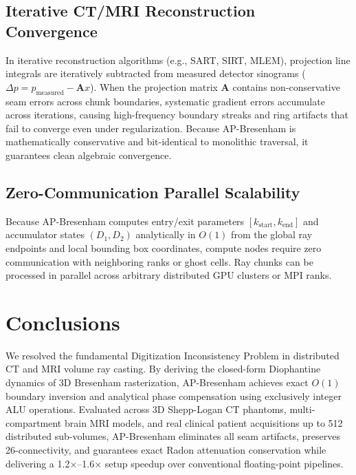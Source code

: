 \documentclass[11pt]{article}
\begin{document}
\subsection*{Iterative CT/MRI Reconstruction Convergence}
In iterative reconstruction algorithms (e.g., SART, SIRT, MLEM), projection line integrals are iteratively subtracted from measured detector sinograms ($\Delta p = p_{\mathrm{measured}} - \mathbf{A} x$). When the projection matrix $\mathbf{A}$ contains non-conservative seam errors across chunk boundaries, systematic gradient errors accumulate across iterations, causing high-frequency boundary streaks and ring artifacts that fail to converge even under regularization.\cite{zhang2023distributed,chen2023exact,wang2025distributed} Because AP-Bresenham is mathematically conservative and bit-identical to monolithic traversal, it guarantees clean algebraic convergence.

\subsection*{Zero-Communication Parallel Scalability}
Because AP-Bresenham computes entry/exit parameters $[k_{\mathrm{start}}, k_{\mathrm{end}}]$ and accumulator states $(D_1, D_2)$ analytically in $O(1)$ from the global ray endpoints and local bounding box coordinates, compute nodes require zero communication with neighboring ranks or ghost cells. Ray chunks can be processed in parallel across arbitrary distributed GPU clusters or MPI ranks.\cite{kim2024heterogeneous,wang2025distributed,liu2026ultra}

\section*{Conclusions}
\label{sec:conclusions}

We resolved the fundamental Digitization Inconsistency Problem in distributed CT and MRI volume ray casting. By deriving the closed-form Diophantine dynamics of 3D Bresenham rasterization, AP-Bresenham achieves exact $O(1)$ boundary inversion and analytical phase compensation using exclusively integer ALU operations. Evaluated across 3D Shepp-Logan CT phantoms, multi-compartment brain MRI models, and real clinical patient acquisitions up to 512 distributed sub-volumes, AP-Bresenham eliminates all seam artifacts, preserves 26-connectivity, and guarantees exact Radon attenuation conservation while delivering a 1.2$\times$--1.6$\times$ setup speedup over conventional floating-point pipelines.
\end{document}
